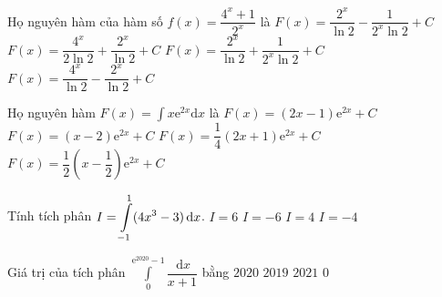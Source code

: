 \begin{ex}%
Họ nguyên hàm của hàm số $f(x)=\dfrac{4^x+1}{2^x}$ là
\choice
{\True $F(x)=\dfrac{2^x}{\ln 2}-\dfrac{1}{2^x\ln2}+C$}
{$F(x)=\dfrac{4^x}{2\ln2}+\dfrac{2^x}{\ln2}+C$}
{$F(x)=\dfrac{2^x}{\ln2}+\dfrac{1}{2^x\ln2}+C$}
{$F(x)=\dfrac{4^x}{\ln2}-\dfrac{2^x}{\ln2}+C$}
\end{ex}

\begin{ex}%
Họ nguyên hàm $F(x)=\displaystyle\int x\mathrm{e}^{2x}\mathrm{d}x$ là
\choice
{$F(x)=(2x-1)\mathrm{e}^{2x}+C$}
{$F(x)=(x-2)\mathrm{e}^{2x}+C$}
{$F(x)=\dfrac{1}{4}(2x+1)\mathrm{e}^{2x}+C$}
{\True $F(x)=\dfrac{1}{2}\left(x-\dfrac{1}{2}\right)\mathrm{e}^{2x}+C$}
\end{ex}

\begin{ex}%
Tính tích phân $\displaystyle \displaystyle I=\int\limits_{-1}^1(4x^3-3)\mathrm{\,d}x$.
\choice
{$I=6$}
{\True $I=-6$}
{$I=4$}
{$I=-4$}
\end{ex}

\begin{ex}%
Giá trị của tích phân $\displaystyle\int\limits_{0}^{\mathrm{e}^{2020}-1} \dfrac{\mathrm{\,d}x}{x+1}$ bằng
\choice
{\True$2020$}
{$2019$}
{$2021$}
{$0$}
\end{ex}

